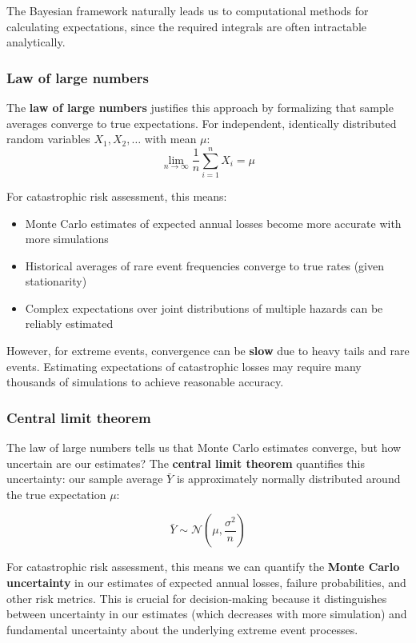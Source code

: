 \documentclass[
  letterpaper,
  DIV=11,
  numbers=noendperiod]{scrreprt}
\providecommand{\tightlist}{%
  \setlength{\itemsep}{0pt}\setlength{\parskip}{0pt}}
\begin{document}
The Bayesian framework naturally leads us to computational methods for
calculating expectations, since the required integrals are often
intractable analytically.

\subsubsection{Law of large numbers}\label{law-of-large-numbers}

The \textbf{law of large numbers} justifies this approach by formalizing
that sample averages converge to true expectations. For independent,
identically distributed random variables \(X_1, X_2, \ldots\) with mean
\(\mu\): \[
\lim_{n \to \infty} \frac{1}{n} \sum_{i=1}^n X_i = \mu
\]

For catastrophic risk assessment, this means:

\begin{itemize}
\tightlist
\item
  Monte Carlo estimates of expected annual losses become more accurate
  with more simulations
\item
  Historical averages of rare event frequencies converge to true rates
  (given stationarity)
\item
  Complex expectations over joint distributions of multiple hazards can
  be reliably estimated
\end{itemize}

However, for extreme events, convergence can be \textbf{slow} due to
heavy tails and rare events. Estimating expectations of catastrophic
losses may require many thousands of simulations to achieve reasonable
accuracy.

\subsubsection{Central limit theorem}\label{central-limit-theorem}

The law of large numbers tells us that Monte Carlo estimates converge,
but how uncertain are our estimates? The \textbf{central limit theorem}
quantifies this uncertainty: our sample average \(\bar{Y}\) is
approximately normally distributed around the true expectation \(\mu\):

\[\bar{Y} \sim \mathcal{N}\left(\mu, \frac{\sigma^2}{n}\right)\]

For catastrophic risk assessment, this means we can quantify the
\textbf{Monte Carlo uncertainty} in our estimates of expected annual
losses, failure probabilities, and other risk metrics. This is crucial
for decision-making because it distinguishes between uncertainty in our
estimates (which decreases with more simulation) and fundamental
uncertainty about the underlying extreme event processes.
\end{document}
